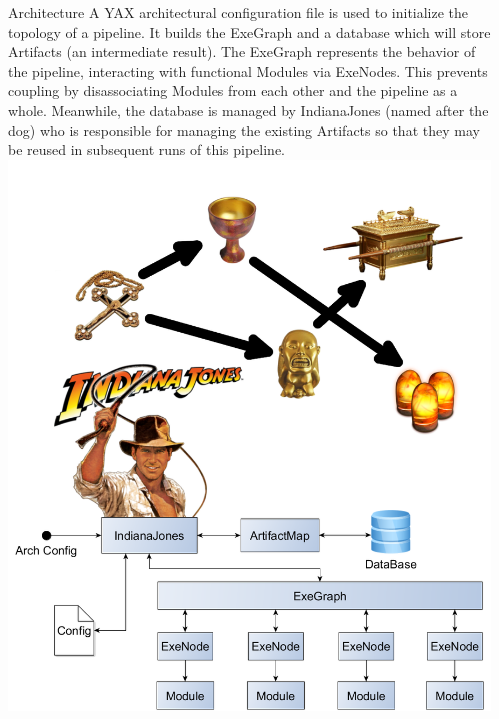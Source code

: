 \documentclass[final,t]{beamer}
\begin{document}
\begin{frame}{}
\begin{columns}[t]
\begin{column}{.3\linewidth}
    \end{column}


    \begin{column}{.3\linewidth}
        \begin{block}{Architecture}
            A YAX architectural configuration file is used to initialize the topology of a pipeline. It builds the
            ExeGraph and a database which will store Artifacts (an intermediate result).
            The ExeGraph represents the behavior of the pipeline, interacting with functional Modules via ExeNodes.
            This prevents coupling by disassociating Modules from each other and the pipeline as a whole. Meanwhile,
            the database is managed by IndianaJones (named after the dog) who is responsible for managing the existing
            Artifacts so that they may be reused in subsequent runs of this pipeline. \newline\newline
            \includegraphics[width=1\linewidth]{assets/arch}


\end{block}
\end{column}
\end{columns}
\end{frame}
\end{document}
